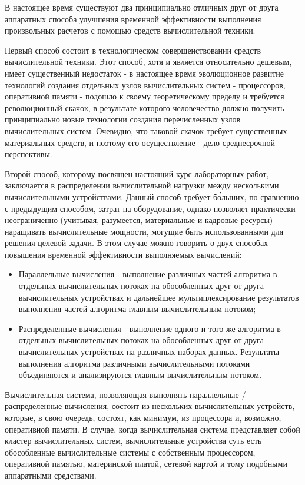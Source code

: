 

В настоящее время существуют два принципиально отличных друг от друга аппаратных способа улучшения временной эффективности выполнения произвольных расчетов с помощью средств вычислительной техники.

Первый способ состоит в технологическом совершенствовании средств вычислительной техники. Этот способ, хотя и является относительно дешевым, имеет существенный недостаток - в настоящее время эволюционное развитие технологий создания отдельных узлов вычислительных систем - процессоров, оперативной памяти - подошло к своему теоретическому пределу и требуется революционный скачок, в результате которого человечество должно получить принципиально новые технологии создания перечисленных узлов вычислительных систем. Очевидно, что таковой скачок требует существенных материальных средств, и поэтому его осуществление - дело среднесрочной перспективы.

Второй способ, которому посвящен настоящий курс лабораторных работ, заключается в распределении вычислительной нагрузки между несколькими вычислительными устройствами. Данный способ требует б\'{о}льших, по сравнению с предыдущим способом, затрат на оборудование, однако позволяет практически неограниченно (учитывая, разумеется, материальные и кадровые ресурсы) наращивать вычислительные мощности, могущие быть использованными для решения целевой задачи. В этом случае можно говорить о двух способах повышения временной эффективности выполняемых вычислений:

\begin{itemize}

	\item Параллельные вычисления - выполнение различных частей алгоритма в отдельных вычислительных потоках на обособленных друг от друга вычислительных устройствах и дальнейшее мультиплексирование результатов выполнения частей алгоритма главным вычислительным потоком;

	\item Распределенные вычисления - выполнение одного и того же алгоритма в отдельных вычислительных потоках на обособленных друг от друга вычислительных устройствах на различных наборах данных. Результаты выполнения алгоритма различными вычислительными потоками объединяются и анализируются главным вычислительным потоком.

\end{itemize}

Вычислительная система, позволяющая выполнять параллельные / распределенные вычисления, состоит из нескольких вычислительных устройств, которые, в свою очередь, состоят, как минимум, из процессора и, возможно, оперативной памяти. В случае, когда вычислительная система представляет собой кластер вычислительных систем, вычислительные устройства суть есть обособленные вычислительные системы с собственным процессором, оперативной памятью, материнской платой, сетевой картой и тому подобными аппаратными средствами.

